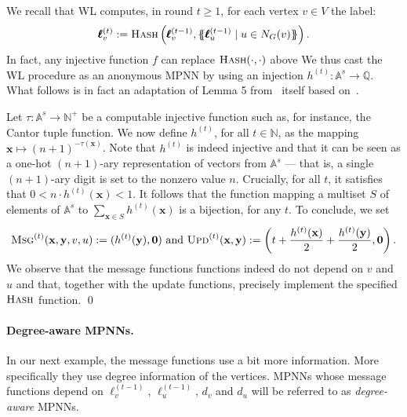 \begin{example}\label{ex:WL}
We recall that WL computes, in round $t \geq 1$, for each vertex $v\in V$ the label:
$$
\pmb{\ell}^{(t)}_v:=\textsc{Hash}\left(\pmb{\ell}^{(t-1)}_v,\{\!\!\{ \pmb{\ell}_u^{(t-1)} \mathrel{\mid} u \in N_G(v) \}\!\!\}\right).
$$
In fact, any injective function $f$ can replace $\textsc{Hash}(\cdot,\cdot)$
above We thus cast the WL procedure as an anonymous MPNN by using an injection
$h^{(t)} : \mathbb{A}^s \to \mathbb{Q}$.  What follows is in fact an
adaptation of Lemma 5 from~\cite{xhlj19} itself based on~\cite[Theorem
2]{ZaheerKRPSS17}.

Let $\tau : \mathbb{A}^s \to \mathbb{N}^+$ be a computable injective function
such as, for instance, the Cantor tuple function.
We now define $h^{(t)}$, for all $t \in \mathbb{N}$, as the mapping
$\mathbf{x} \mapsto (n+1)^{-\tau(\mathbf{x})}$. Note that $h^{(t)}$ is indeed
injective and that it can be seen as a one-hot $(n+1)$-ary representation of
vectors from $\mathbb{A}^s$ --- that is, a single $(n+1)$-ary digit is set to
the nonzero value $n$.
Crucially, for all $t$, it satisfies that $0 < n \cdot h^{(t)}(\mathbf{x})
< 1$. It follows that the function mapping a multiset $S$ of elements of
$\mathbb{A}^s$ to $\sum_{\mathbf{x} \in S} h^{(t)}(\mathbf{x})$ is a
bijection, for any $t$. To conclude, we set 
\[
\textsc{Msg}^{(t)}(\mathbf{x},\mathbf{y},v,u) :=
(h^{(t)}(\mathbf{y}),\mathbf{0}) \text{ and }
\textsc{Upd}^{(t)}(\mathbf{x},\mathbf{y}) := \left(t +
\frac{h^{(t)}(\mathbf{x})}{2} + \frac{h^{(t)}(\mathbf{y})}{2},
\mathbf{0}\right).
\]
We observe that the message functions functions indeed do not depend on $v$
and $u$ and that, together with the update functions, precisely implement the
specified $\textsc{Hash}$ function.
\qed
 \end{example}

\paragraph{Degree-aware MPNNs.} In our next example, the message functions use a bit more information. More specifically they use  degree information of the vertices.
MPNNs whose message functions depend on 
 $\pmb{\ell}_v^{(t-1)}$, $\pmb{\ell}_u^{(t-1)}$, $d_v$ and $d_u$ will be referred to as \textit{degree-aware} MPNNs. 

